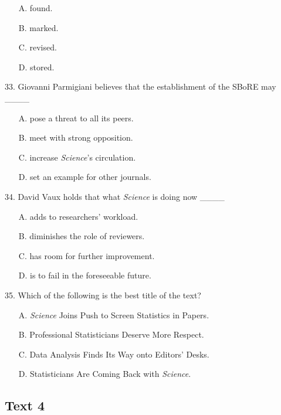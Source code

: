 \documentclass[UTF8,11pt]{ctexart}
\begin{document}
\begin{itemize}[leftmargin=2em,itemsep=.2em,topsep=.4em]\item[A.] found.
\item[B.] marked.
\item[C.] revised.
\item[D.] stored.
\end{itemize}

33. Giovanni Parmigiani believes that the establishment of the SBoRE may \_\_\_\_


\begin{itemize}[leftmargin=2em,itemsep=.2em,topsep=.4em]\item[A.] pose a threat to all its peers.
\item[B.] meet with strong opposition.
\item[C.] increase \textit{Science}’s circulation.
\item[D.] set an example for other journals.
\end{itemize}

34. David Vaux holds that what \textit{Science} is doing now \_\_\_\_


\begin{itemize}[leftmargin=2em,itemsep=.2em,topsep=.4em]\item[A.] adds to researchers’ workload.
\item[B.] diminishes the role of reviewers.
\item[C.] has room for further improvement.
\item[D.] is to fail in the foreseeable future.
\end{itemize}

35. Which of the following is the best title of the text?


\begin{itemize}[leftmargin=2em,itemsep=.2em,topsep=.4em]\item[A.] \textit{Science} Joins Push to Screen Statistics in Papers.
\item[B.] Professional Statisticians Deserve More Respect.
\item[C.] Data Analysis Finds Its Way onto Editors’ Desks.
\item[D.] Statisticians Are Coming Back with \textit{Science}.
\end{itemize}

\subsection*{\textbf{Text 4}}
\end{document}
